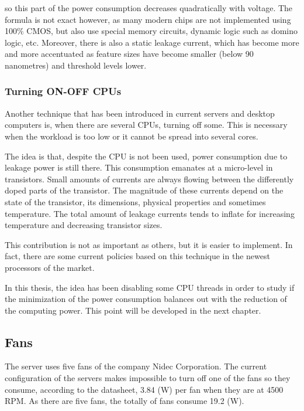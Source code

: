so this part of the power consumption decreases quadratically with voltage. The formula is not exact however, as many modern chips are not implemented using 100$\%$ CMOS, but also use special memory circuits, dynamic logic such as domino logic, etc. Moreover, there is also a static leakage current, which has become more and more accentuated as feature sizes have become smaller (below 90 nanometres) and threshold levels lower.

\subsubsection{Turning ON-OFF CPUs}

Another technique that has been introduced in current servers and desktop computers is, when there are several CPUs, turning off some. This is necessary when the workload is too low or it cannot be spread into several cores.

The idea is that, despite the CPU is not been used, power consumption due to leakage power is still there. This consumption emanates at a micro-level in transistors. Small amounts of currents are always flowing between the differently doped parts of the transistor. The magnitude of these currents depend on the state of the transistor, its dimensions, physical properties and sometimes temperature. The total amount of leakage currents tends to inflate for increasing temperature and decreasing transistor sizes.

This contribution is not as important as others, but it is easier to implement. In fact, there are some current policies based on this technique in the newest processors of the market. 


In this thesis, the idea has been disabling some CPU threads in order to study if the minimization of the power consumption balances out with the reduction of the computing power. This point will be developed in the next chapter.






    \subsection{Fans}
    
    The server uses five fans of the company Nidec Corporation. The current configuration of the servers makes impossible to turn off one of the fans so they consume, according to the datasheet, 3.84 (W) per fan when they are at 4500 RPM. As there are five fans, the totally of fans consume 19.2 (W).
    

